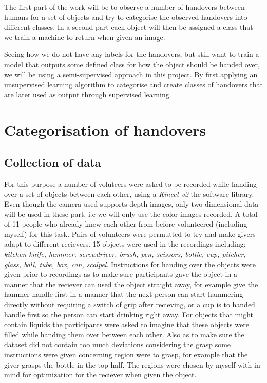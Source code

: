 The first part of the work will be to observe a number of handovers between humans for a set of objects and try to categorise the observed handovers into different classes. In a second part each object will then be assigned a class that we train a machine to return when given an image.

Seeing how we do not have any labels for the handovers, but still want to train a model that outputs some defined class for how the object should be handed over, we will be using a semi-supervised approach in this project. By first applying an unsupervised learning algorithm to categorise and create classes of handovers that are later used as output through supervised learning.

\section{Categorisation of handovers}

\subsection{Collection of data}

For this purpose a number of voluteers were asked to be recorded while handing over a set of objects between each other, using a \emph{Kinect v2} the \textcite{libfreenect2} software library. Even though the camera used supports depth images, only two-dimensional data will be used in these part, i.e we will only use the color images recorded. A total of 11 people who already knew each other from before volunteered (including myself) for this task.  Pairs of volunteers were permutted to try and make givers adapt to different recievers. 15 objects were used in the recordings including: \emph{kitchen knife, hammer, screwdriver, brush, pen, scissors, bottle, cup, pitcher, glass, ball, tube, box, can, scalpel}. Instructions for handing over the objects were given prior to recordings as to make sure participants gave the object in a manner that the reciever can used the object straight away, for example give the hammer handle first in a manner that the next person can start hammering directly without requiring a switch of grip after recieving, or a cup is to handed handle first so the person can start drinking right away. For objects that might contain liquids the participants were asked to imagine that these objects were filled while handing them over between each other. Also as to make sure the dataset did not contain too much deviations considering the grasp some instructions were given concerning region were to grasp, for example that the giver grasps the bottle in the top half. The regions were chosen by myself with in mind for optimization for the reciever when given the object.

